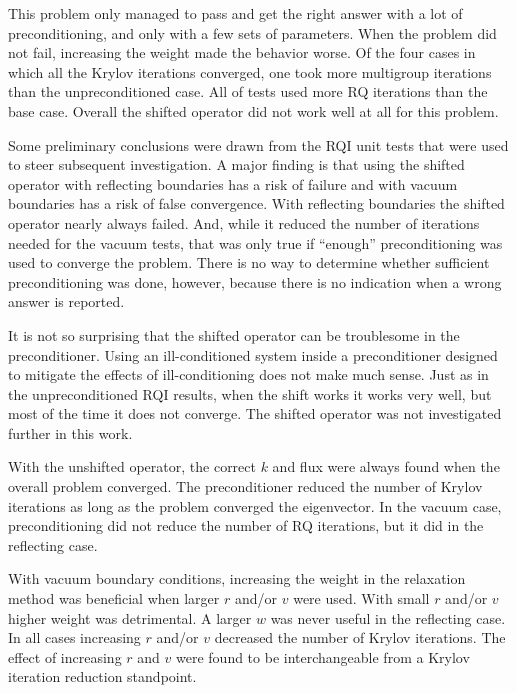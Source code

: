 This problem only managed to pass and get the right answer with a lot of preconditioning, and only with a few sets of parameters. When the problem did not fail, increasing the weight made the behavior worse. Of the four cases in which all the Krylov iterations converged, one took more multigroup iterations than the unpreconditioned case. All of tests used more RQ iterations than the base case. Overall the shifted operator did not work well at all for this problem.

Some preliminary conclusions were drawn from the RQI unit tests that were used to steer subsequent investigation. A major finding is that using the shifted operator with reflecting boundaries has a risk of failure and with vacuum boundaries has a risk of false convergence. With reflecting boundaries the shifted operator nearly always failed. And, while it reduced the number of iterations needed for the vacuum tests, that was only true if ``enough'' preconditioning was used to converge the problem. There is no way to determine whether sufficient preconditioning was done, however, because there is no indication when a wrong answer is reported. 

It is not so surprising that the shifted operator can be troublesome in the preconditioner. Using an ill-conditioned system inside a preconditioner designed to mitigate the effects of ill-conditioning does not make much sense. Just as in the unpreconditioned RQI results, when the shift works it works very well, but most of the time it does not converge. The shifted operator was not investigated further in this work.

With the unshifted operator, the correct $k$ and flux were always found when the overall problem converged. The preconditioner reduced the number of Krylov iterations as long as the problem converged the eigenvector. In the vacuum case, preconditioning did not reduce the number of RQ iterations, but it did in the reflecting case. 

With vacuum boundary conditions, increasing the weight in the relaxation method was beneficial when larger $r$ and/or $v$ were used. With small $r$ and/or $v$ higher weight was detrimental. A larger $w$ was never useful in the reflecting case. In all cases increasing $r$ and/or $v$ decreased the number of Krylov iterations. The effect of increasing $r$ and $v$ were found to be interchangeable from a Krylov iteration reduction standpoint. 

